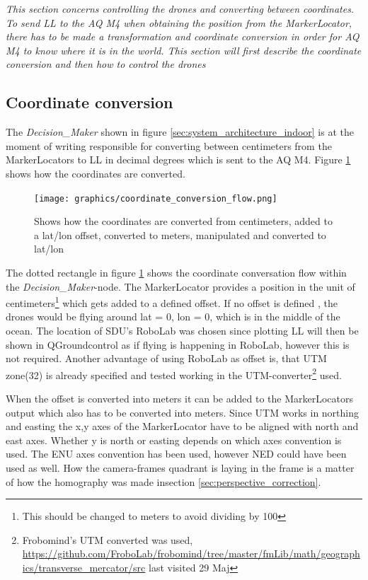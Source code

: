\textit{This section concerns controlling the drones and converting between coordinates. To send \ac{LL} to the \ac{AQ} M4 when obtaining the position from the MarkerLocator, there has to be made a transformation and coordinate conversion in order for \ac{AQ} M4 to know where it is in the world. This section will first describe the coordinate conversion and then how to control the drones}

\subsection{Coordinate conversion}
The \textit{Decision\_Maker} shown in figure \ref{sec:system_architecture_indoor} is at the moment of writing responsible for converting between centimeters from the MarkerLocators to \ac{LL} in decimal degrees which is sent to the AQ M4. Figure \ref{fig:coordinate_flow} shows how the coordinates are converted.

\begin{figure}[H]
    \center
    \texttt{[image: graphics/coordinate\_conversion\_flow.png]}
  	\caption{Shows how the coordinates are converted from centimeters, added to a lat/lon offset, converted to meters, manipulated and converted to lat/lon}
    \label{fig:coordinate_flow}
\end{figure}

The dotted 
rectangle in figure \ref{fig:coordinate_flow} shows the coordinate conversation flow within the \textit{Decision\_Maker}-node.
The MarkerLocator provides a position in the unit of centimeters\footnote{This should be changed to meters to avoid dividing by 100} which gets added to a defined offset.
If no offset is defined , the drones would be flying around lat = 0, lon = 0, which is in the middle of the ocean.
The location of SDU's RoboLab was chosen since plotting \ac{LL} will then be shown in QGroundcontrol as if flying is happening in RoboLab, however this is not required.
Another advantage of using RoboLab as offset is, that \ac{UTM} zone(32) is already specified and tested working in the \ac{UTM}-converter\footnote{Frobomind's UTM converted was used, \url{https://github.com/FroboLab/frobomind/tree/master/fmLib/math/geographics/transverse_mercator/src} last visited 29 Maj} used.

When the offset is converted into meters it can be added to the MarkerLocators output which also has to be converted into meters.
Since UTM works in northing and easting the x,y axes of the MarkerLocator have to be aligned with north and east axes. Whether y is north or easting  depends on which axes convention is used.
The \ac{ENU} axes convention has been used, however \ac{NED} could have been used as well.
How the camera-frames quadrant is laying in the frame is a matter of how the homography was made insection \ref{sec:perspective_correction}.

